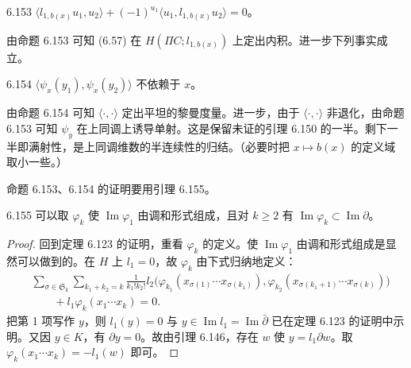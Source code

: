 \begin{proposition}{6.153}
  $\langle l_{1,b(x)}u_1,u_2\rangle+(-1)^{u_1}\langle u_1,l_{1,b(x)}u_2\rangle=0$。
\end{proposition}

由命题 6.153 可知 (6.57) 在 $H(\Pi C;l_{1,b(x)})$ 上定出内积。进一步下列事实成立。

\begin{proposition}{6.154}
  $\langle\psi_x(y_1),\psi_x(y_2)\rangle$ 不依赖于 $x$。
\end{proposition}

由命题 6.154 可知 $\langle\cdot,\cdot\rangle$ 定出平坦的黎曼度量。进一步，由于 $\langle\cdot,\cdot\rangle$ 非退化，由命题 6.153 可知 $\psi_y$ 在上同调上诱导单射。这是保留未证的引理 6.150 的一半。剩下一半即满射性，是上同调维数的半连续性的归结。（必要时把 $x\mapsto b(x)$ 的定义域取小一些。）

命题 6.153、6.154 的证明要用引理 6.155。

\begin{lemma*}{6.155}
  可以取 $\varphi_k$ 使 $\operatorname{Im}\varphi_1$ 由调和形式组成，且对 $k\ge2$ 有 $\operatorname{Im}\varphi_k\subset\operatorname{Im}\partial$。
\end{lemma*}

\begin{proof}
  回到定理 6.123 的证明，重看 $\varphi_k$ 的定义。使 $\operatorname{Im}\varphi_1$ 由调和形式组成是显然可以做到的。在 $H$ 上 $l_1=0$，故 $\varphi_k$ 由下式归纳地定义：
  \begin{align*}
    &\sum_{\sigma\in\mathfrak{S}_k}\sum_{k_1+k_2=k}\frac{1}{k_1!k_2!}
    l_2\bigl(\varphi_{k_1}(x_{\sigma(1)}\cdots x_{\sigma(k_1)}),
    \varphi_{k_2}(x_{\sigma(k_1+1)}\cdots x_{\sigma(k)})\bigr)\\
    &\qquad+l_1\varphi_k(x_1\cdots x_k)=0.
  \end{align*}
  把第 1 项写作 $y$，则 $l_1(y)=0$ 与 $y\in\operatorname{Im}l_1=\operatorname{Im}\bar\partial$ 已在定理 6.123 的证明中示明。又因 $y\in K$，有 $\partial y=0$。故由引理 6.146，存在 $w$ 使 $y=l_1\partial w$。取 $\varphi_k(x_1\cdots x_k)=-l_1(w)$ 即可。
\end{proof}


